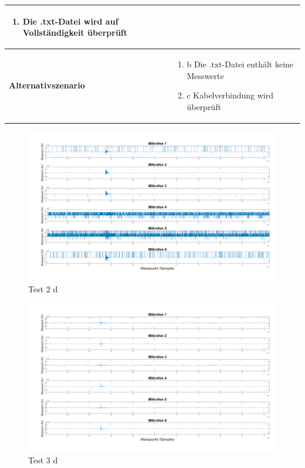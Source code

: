 \begin{tabularx}{\columnwidth}{|p{4cm}|X|}
\begin{enumerate}
								\item Die .txt-Datei wird auf Vollständigkeit überprüft
							\end{enumerate}\\
	\hline
	\textbf{Alternativszenario} & \begin{enumerate}
									\item b Die .txt-Datei enthält keine Messwerte
									\item c Kabelverbindung wird überprüft
								\end{enumerate}\\
	\hline
	\hline
\end{tabularx}
\label{tab:}

\begin{figure}[h]
	\begin{center}
		\includegraphics[width=\textwidth]{Sections/Programmierung/Test_2_d}
	\end{center}
	\caption{Test 2 d}
	\label{fig:Test_2_d}
\end{figure}

\begin{figure}[h]
	\begin{center}
		\includegraphics[width=\textwidth]{Sections/Programmierung/Test_3_d}
	\end{center}
	\caption{Test 3 d}
	\label{fig:Test_3_d}
\end{figure}

\newpage